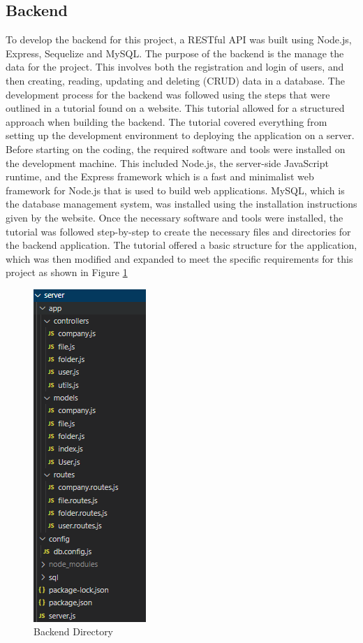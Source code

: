\subsection{Backend}
To develop the backend for this project, a RESTful API was built using Node.js, Express, Sequelize and MySQL. The purpose of the backend is the manage the data for the project. This involves both the registration and login of users, and then creating, reading, updating and deleting (CRUD) data in a database. 
The development process for the backend was followed using the steps that were outlined in a tutorial found on a website. \cite{bezkoder} This tutorial allowed for a structured approach when building the backend. The tutorial covered everything from setting up the development environment to deploying the application on a server. 
\newline \newline
Before starting on the coding, the required software and tools were installed on the development machine. This included Node.js, the server-side JavaScript runtime, and the Express framework which is a fast and minimalist web framework for Node.js that is used to build web applications. MySQL, which is the database management system, was installed using the installation instructions given by the website. \cite{mySQLinstall} Once the necessary software and tools were installed, the tutorial was followed step-by-step to create the necessary files and directories for the backend application. The tutorial offered a basic structure for the application, which was then modified and expanded to meet the specific requirements for this project as shown in Figure \ref{fig:backendDirectory}
\begin{center}
    \begin{figure}[h!]
        \centering
        \label{fig:backendDirectory}
        \includegraphics[height=0.40\textheight]{images/backendDirectory.png}
        \caption{Backend Directory}
    \end{figure}
\end{center}
